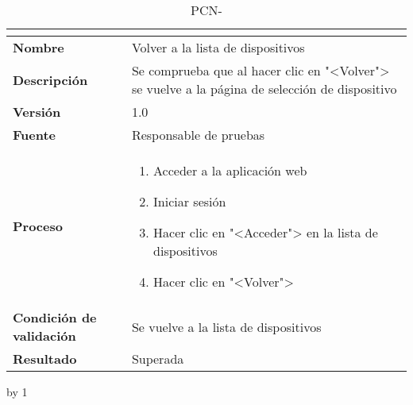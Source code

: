 \begin{table}[H]
	\caption{PCN-\number\pcn}
	\begin{tabular}{|l|p{}|}
		\hline
		\multicolumn{2}{|c|}{\cellcolor[HTML]{BFBFBF}{\color[HTML]{000000} \textbf{PCN-\number\pcn}}} \\ \hline
		\textbf{Nombre}                  & Volver a la lista de dispositivos                                                              \\ \hline
		\textbf{Descripción}             & Se comprueba que al hacer clic en "<Volver"> se vuelve a la página de selección de dispositivo \\ \hline
		\textbf{Versión}                 & 1.0                                                                                            \\ \hline
		\textbf{Fuente}                  & Responsable de pruebas                                                                         \\ \hline
		\textbf{Proceso}                 & \begin{enumerate}
			\item Acceder a la aplicación web
			\item Iniciar sesión
			\item Hacer clic en "<Acceder"> en la lista de dispositivos
			\item Hacer clic en "<Volver">
		\end{enumerate}                                                                     \\ \hline
		\textbf{Condición de validación} & Se vuelve a la lista de dispositivos                                                           \\ \hline
		\textbf{Resultado}               & Superada                                                                                       \\ \hline
	\end{tabular}
\end{table}
\advance\pcn by 1
